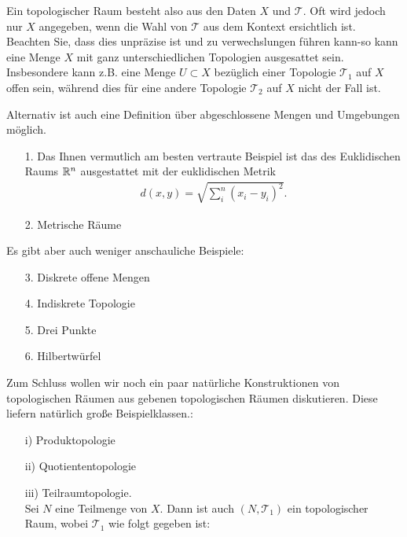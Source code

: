 Ein topologischer Raum besteht also aus den Daten $X$ und $\mathcal{T}$.
Oft wird jedoch nur $X$ angegeben, wenn die Wahl von $\mathcal{T}$ aus dem Kontext ersichtlich ist.
Beachten Sie, dass dies unpräzise ist und zu verwechslungen führen kann-so kann eine Menge $X$ mit ganz unterschiedlichen Topologien ausgesattet sein. 
Insbesondere kann z.B. eine Menge $U\subset X$ bezüglich einer Topologie $\mathcal{T}_1$ auf $X$ offen sein, während dies für eine andere Topologie $\mathcal{T}_2$ auf $X$
nicht der Fall ist.

\begin{bem}
Alternativ ist auch eine Definition über abgeschlossene Mengen und Umgebungen möglich.
\end{bem}

\begin{bsp}
\begin{itemize}
\item[1.] Das Ihnen vermutlich am besten vertraute Beispiel ist das des Euklidischen Raums $\mathbb{R}^n$ ausgestattet mit der euklidischen Metrik
\begin{align*}
d(x,y) = \sqrt{\sum_i^n (x_i - y_i)^2}.
\end{align*}
\item[2.] Metrische Räume\\
\end{itemize}
Es gibt aber auch weniger anschauliche Beispiele:

\begin{itemize}
\item[3.] Diskrete offene Mengen
\item[4.] Indiskrete Topologie
\item[5.] Drei Punkte
\item[6.] Hilbertwürfel
\end{itemize}
\end{bsp}

Zum Schluss wollen wir noch ein paar natürliche Konstruktionen von topologischen Räumen aus gebenen topologischen Räumen diskutieren. 
Diese liefern natürlich große Beispielklassen.:
\begin{bsp}
\begin{enumerate}
\item[i)] Produktopologie
\item[ii)] Quotiententopologie
\item[iii)] Teilraumtopologie. \\
	Sei $N$ eine Teilmenge von $X$. Dann ist auch $(N,\mathcal{T}_1)$ ein topologischer Raum, wobei $\mathcal{T}_1$ wie folgt gegeben ist:\\
\end{enumerate}
\end{bsp}

